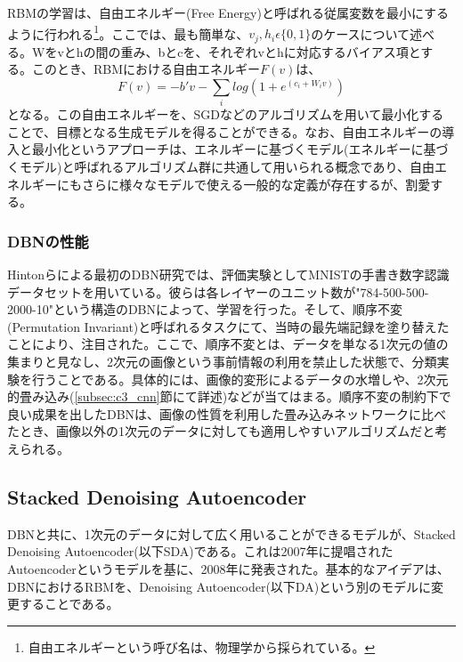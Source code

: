 RBMの学習は、自由エネルギー(Free Energy)と呼ばれる従属変数を最小にするように行われる\footnote{自由エネルギーという呼び名は、物理学から採られている。}。ここでは、最も簡単な、$v_j, h_i\epsilon\{0,1\}$のケースについて述べる。Wをvとhの間の重み、bとcを、それぞれvとhに対応するバイアス項とする。このとき、RBMにおける自由エネルギー$F(v)$は、
\begin{equation}
F(v) = -b' v-\sum_{i}log(1+e^{(c_i+W_{i}v)})
\end{equation}
となる。この自由エネルギーを、SGDなどのアルゴリズムを用いて最小化することで、目標となる生成モデルを得ることができる。なお、自由エネルギーの導入と最小化というアプローチは、エネルギーに基づくモデル(エネルギーに基づくモデル)と呼ばれるアルゴリズム群に共通して用いられる概念であり、自由エネルギーにもさらに様々なモデルで使える一般的な定義が存在するが、割愛する。
\subsubsection{DBNの性能}
Hintonらによる最初のDBN研究では、評価実験としてMNISTの手書き数字認識データセットを用いている。彼らは各レイヤーのユニット数が"784-500-500-2000-10"という構造のDBNによって、学習を行った。そして、順序不変(Permutation Invariant)と呼ばれるタスクにて、当時の最先端記録を塗り替えたことにより、注目された。ここで、順序不変とは、データを単なる1次元の値の集まりと見なし、2次元の画像という事前情報の利用を禁止した状態で、分類実験を行うことである。具体的には、画像的変形によるデータの水増しや、2次元的畳み込み(\ref{subsec:c3_cnn}節にて詳述)などが当てはまる。順序不変の制約下で良い成果を出したDBNは、画像の性質を利用した畳み込みネットワークに比べたとき、画像以外の1次元のデータに対しても適用しやすいアルゴリズムだと考えられる。

\subsection{Stacked Denoising Autoencoder}
DBNと共に、1次元のデータに対して広く用いることができるモデルが、Stacked Denoising Autoencoder(以下SDA)である。これは2007年に提唱されたAutoencoder\cite{bengio2007greedy}というモデルを基に、2008年に発表された\cite{vincent2008extracting}。基本的なアイデアは、DBNにおけるRBMを、Denoising Autoencoder(以下DA)という別のモデルに変更することである。
